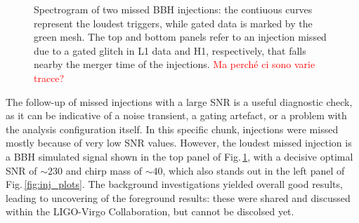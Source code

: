 \documentclass[binding=0.6cm, LaM]{sapthesis}
\newcommand{\fpg}[1]{\textcolor{red}{#1} }
\begin{document}
        \begin{figure}[t]
          \noindent
          \label{gated}
          \centering
          \caption{Spectrogram of two missed BBH injections: the contiuous curves represent the loudest triggers, while gated data is marked by the green mesh.  The top and bottom panels refer to an injection missed due to a gated glitch in L1 data and H1, respectively, that falls nearby the merger time of the injections.  \fpg{Ma perch\'e ci sono varie tracce?}}
          \label{fig:gated}
        \end{figure}

	The follow-up of missed injections with a large SNR is a useful diagnostic check, 
	as it can be indicative of a noise transient, a gating artefact, or a problem with the analysis configuration itself.
	In this specific chunk, injections were missed mostly because of very low SNR values.
	However, the loudest missed injection is a BBH simulated signal shown in the top panel of Fig.\,\ref{fig:gated},
	with a decisive optimal SNR of $\sim 230$ and chirp mass of $\sim 40$,
	which also stands out in the left panel of Fig.\,\ref{fig:inj_plots}.
	The background investigations yielded overall good results,
	leading to uncovering of the foreground results:
	these were shared and discussed within the LIGO-Virgo Collaboration, but cannot be discolsed yet.
\end{document}
